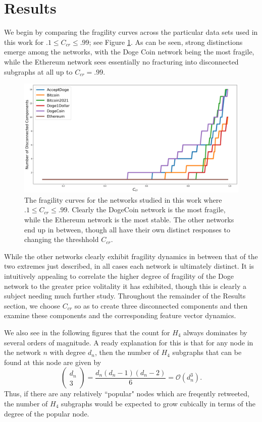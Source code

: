 \documentclass[a4paper,11pt]{article}
\begin{document}
\section{Results}
We begin by comparing the fragility curves across the particular data sets used in this work for $.1\leq C_{cr} \leq .99$; see Figure \ref{fig:fragilitycurves}.  As can be seen, strong distinctions emerge among the networks, with the Doge Coin network being the most fragile, while the Ethereum network sees essentially no fracturing into disconnected subgraphs at all up to $C_{cr}=.99$.  
\begin{figure}[!h]
\centering
\includegraphics[width=1\textwidth]{Images/Fragility_Curves}
\caption{The fragility curves for the networks studied in this work where $.1\leq C_{cr}\leq .99$. Clearly the DogeCoin network is the most fragile, while the Ethereum network is the most stable.  The other networks end up in between, though all have their own distinct responses to changing the threshhold $C_{cr}$.}
\label{fig:fragilitycurves}
\end{figure}
While the other networks clearly exhibit fragility dynamics in between that of the two extremes just described, in all cases each network is ultimately distinct.  It is intuitively appealing to correlate the higher degree of fragility of the Doge network to the greater price volitality it has exhibited, though this is clearly a subject needing much further study.  Throughout the remainder of the Results section, we choose $C_{cr}$ so as to create three disconnected components and then examine these components and the corresponding feature vector dynamics.  

We also see in the following figures that the count for $H_{4}$ always dominates by several orders of magnitude.  A ready explanation for this is that for any node in the network $n$ with degree $d_{n}$, then the number of $H_{4}$ subgraphs that can be found at this node are given by 
\[
\begin{pmatrix} d_{n} \\ 3 \end{pmatrix} = \frac{d_{n}(d_{n}-1)(d_{n}-2)}{6} = \mathcal{O}(d_{n}^{3}).
\]
Thus, if there are any relatively ``popular" nodes which are freqently retweeted, the number of $H_{4}$ subgraphs would be expected to grow cubically in terms of the degree of the popular node.  
\end{document}

